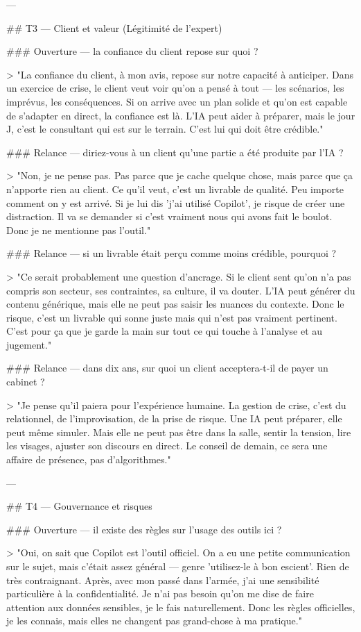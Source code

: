---

## T3 — Client et valeur (Légitimité de l'expert)

### Ouverture — la confiance du client repose sur quoi ?

> "La confiance du client, à mon avis, repose sur notre capacité à anticiper. Dans un exercice de crise, le client veut voir qu'on a pensé à tout — les scénarios, les imprévus, les conséquences. Si on arrive avec un plan solide et qu'on est capable de s'adapter en direct, la confiance est là. L'IA peut aider à préparer, mais le jour J, c'est le consultant qui est sur le terrain. C'est lui qui doit être crédible."

### Relance — diriez-vous à un client qu'une partie a été produite par l'IA ?

> "Non, je ne pense pas. Pas parce que je cache quelque chose, mais parce que ça n'apporte rien au client. Ce qu'il veut, c'est un livrable de qualité. Peu importe comment on y est arrivé. Si je lui dis 'j'ai utilisé Copilot', je risque de créer une distraction. Il va se demander si c'est vraiment nous qui avons fait le boulot. Donc je ne mentionne pas l'outil."

### Relance — si un livrable était perçu comme moins crédible, pourquoi ?

> "Ce serait probablement une question d'ancrage. Si le client sent qu'on n'a pas compris son secteur, ses contraintes, sa culture, il va douter. L'IA peut générer du contenu générique, mais elle ne peut pas saisir les nuances du contexte. Donc le risque, c'est un livrable qui sonne juste mais qui n'est pas vraiment pertinent. C'est pour ça que je garde la main sur tout ce qui touche à l'analyse et au jugement."

### Relance — dans dix ans, sur quoi un client acceptera-t-il de payer un cabinet ?

> "Je pense qu'il paiera pour l'expérience humaine. La gestion de crise, c'est du relationnel, de l'improvisation, de la prise de risque. Une IA peut préparer, elle peut même simuler. Mais elle ne peut pas être dans la salle, sentir la tension, lire les visages, ajuster son discours en direct. Le conseil de demain, ce sera une affaire de présence, pas d'algorithmes."

---

## T4 — Gouvernance et risques

### Ouverture — il existe des règles sur l'usage des outils ici ?

> "Oui, on sait que Copilot est l'outil officiel. On a eu une petite communication sur le sujet, mais c'était assez général — genre 'utilisez-le à bon escient'. Rien de très contraignant. Après, avec mon passé dans l'armée, j'ai une sensibilité particulière à la confidentialité. Je n'ai pas besoin qu'on me dise de faire attention aux données sensibles, je le fais naturellement. Donc les règles officielles, je les connais, mais elles ne changent pas grand-chose à ma pratique."

